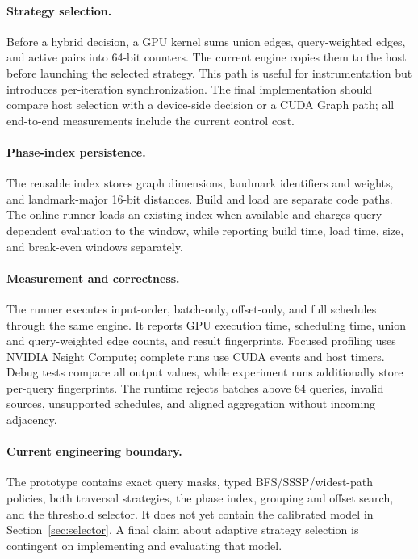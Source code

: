 \paragraph{Strategy selection.}
Before a hybrid decision, a GPU kernel sums union edges, query-weighted edges, and active pairs into 64-bit counters.  The current engine copies them to the host before launching the selected strategy.  This path is useful for instrumentation but introduces per-iteration synchronization.  The final implementation should compare host selection with a device-side decision or a CUDA Graph path; all end-to-end measurements include the current control cost.

\paragraph{Phase-index persistence.}
The reusable index stores graph dimensions, landmark identifiers and weights, and landmark-major 16-bit distances.  Build and load are separate code paths.  The online runner loads an existing index when available and charges query-dependent evaluation to the window, while reporting build time, load time, size, and break-even windows separately.

\paragraph{Measurement and correctness.}
The runner executes input-order, batch-only, offset-only, and full schedules through the same engine.  It reports GPU execution time, scheduling time, union and query-weighted edge counts, and result fingerprints.  Focused profiling uses NVIDIA Nsight Compute; complete runs use CUDA events and host timers.  Debug tests compare all output values, while experiment runs additionally store per-query fingerprints.  The runtime rejects batches above 64 queries, invalid sources, unsupported schedules, and aligned aggregation without incoming adjacency.

\paragraph{Current engineering boundary.}
The prototype contains exact query masks, typed BFS/SSSP/widest-path policies, both traversal strategies, the phase index, grouping and offset search, and the threshold selector.  It does not yet contain the calibrated model in Section~\ref{sec:selector}.  A final claim about adaptive strategy selection is contingent on implementing and evaluating that model.
